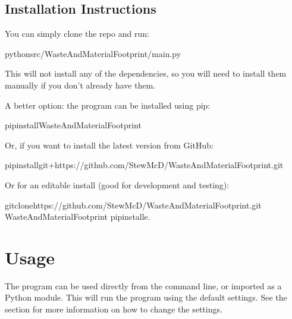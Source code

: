 \documentclass[letterpaper,10pt,english]{sphinxmanual}
\begin{document}
\section{Installation Instructions}
\label{\detokenize{installation:installation-instructions}}
\sphinxAtStartPar
{}

\sphinxAtStartPar
You can simply clone the repo and run:

\begin{sphinxVerbatim}[commandchars=\\\{\}]
pythonsrc/WasteAndMaterialFootprint/main.py
\end{sphinxVerbatim}

\sphinxAtStartPar
This will not install any of the dependencies, so you will need to install them manually if you don’t already have them.

\sphinxAtStartPar
A better option: the program can be installed using pip:

\begin{sphinxVerbatim}[commandchars=\\\{\}]
pipinstallWasteAndMaterialFootprint
\end{sphinxVerbatim}

\sphinxAtStartPar
Or, if you want to install the latest version from GitHub:

\begin{sphinxVerbatim}[commandchars=\\\{\}]
pipinstallgit+https://github.com/Stew\PYGZhy{}McD/WasteAndMaterialFootprint.git
\end{sphinxVerbatim}

\sphinxAtStartPar
Or for an editable install (good for development and testing):

\begin{sphinxVerbatim}[commandchars=\\\{\}]
gitclonehttps://github.com/Stew\PYGZhy{}McD/WasteAndMaterialFootprint.git
WasteAndMaterialFootprint
pipinstall\PYGZhy{}e.
\end{sphinxVerbatim}

\sphinxstepscope


\chapter{Usage}
\label{\detokenize{usage:usage}}\label{\detokenize{usage::doc}}
\sphinxAtStartPar
The program can be used directly from the command line, or imported as a Python module. This will run the program using the default settings. See the  section for more information on how to change the settings.
\end{document}
